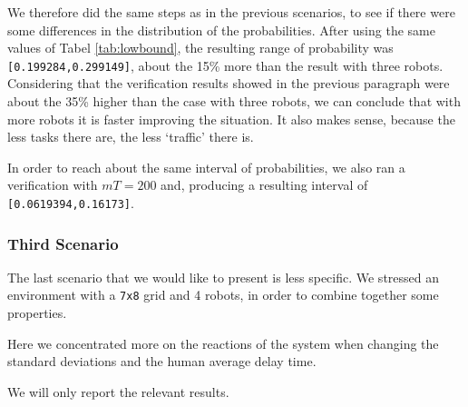 We therefore did the same steps as in the previous scenarios, to see if there were some differences in the distribution of the probabilities. After using the same values of Tabel \ref{tab:lowbound}, the resulting range of probability was \texttt{[0.199284,0.299149]}, about the 15\% more than the result with three robots. Considering that the verification results showed in the previous paragraph were about the 35\% higher than the case with three robots, we can conclude that with more robots it is faster improving the situation. It also makes sense, because the less tasks there are, the less `traffic' there is.

In order to reach about the same interval of probabilities, we also ran a verification with $mT = 200$ and, producing a resulting interval of \\ \texttt{[0.0619394,0.16173]}.

\subsubsection{Third Scenario}
The last scenario that we would like to present is less specific. We stressed an environment with a \texttt{7x8} grid and 4 robots, in order to combine together some properties.

Here we concentrated more on the reactions of the system when changing the standard deviations and the human average delay time.

We will only report the relevant results.